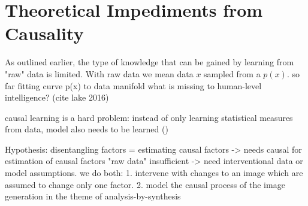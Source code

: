 \section{Theoretical Impediments from Causality}\label{sec:causality}
	As outlined earlier, the type of knowledge that can be gained by learning from "raw" data is limited. With raw data we mean data $x$ sampled from a $p(x)$.
	so far fitting curve p(x) to data manifold
	what is missing to human-level intelligence? (cite lake 2016)

	causal learning is a hard problem: instead of only learning statistical measures from data, model also needs to be learned (\cite{peters17elements})


	Hypothesis: disentangling factors = estimating causal factors -> needs causal
	for estimation of causal factors "raw data" insufficient -> need interventional data or model assumptions.
	we do both:
	1. intervene with changes to an image which are assumed to change only one factor.
	2. model the causal process of the image generation in the theme of analysis-by-synthesis


